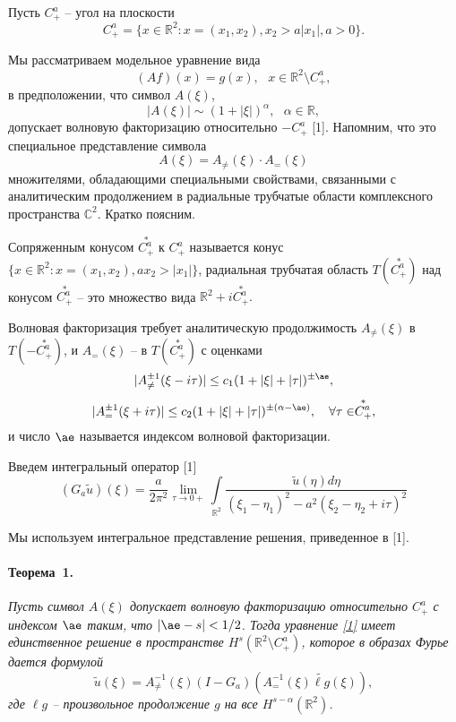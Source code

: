 \documentclass{vzmsthesis}
\begin{document}



\vzmscaption



Пусть $C^a_+$ -- угол на плоскости
\[
C^a_+=\{x\in\mathbb R^2: x=(x_1,x_2), x_2>a|x_1|, a>0\}.
\]

Мы рассматриваем модельное уравнение вида
\begin{equation}\label{1}
(Af)(x)=g(x),~~~x\in\mathbb R^{2}\setminus C^a_+,
\end{equation}
в предположении, что символ $A(\xi)$,
 \[
 |A(\xi)|\sim(1+|\xi|)^{\alpha},~~~\alpha\in\mathbb R,
 \]
 допускает волновую факторизацию относительно $-C^a_+$ [1].  Напомним, что это специальное представление символа
\[
A(\xi)=A_{\neq}(\xi)\cdot A_=(\xi)
\]
 множителями, обладающими специальными свойствами, связанными с аналитическим продолжением в радиальные трубчатые области комплексного пространства  $\mathbb C^2$. Кратко поясним.

 Сопряженным конусом $\stackrel{*}{C^a_+}$ к $C^a_+$  называется конус $\{x\in\mathbb R^2: x=(x_1,x_2), ax_2>|x_1|\}$, радиальная трубчатая область $T(\stackrel{*}{C^a_+})$ над конусом $\stackrel{*}{C^a_+}$ -- это множество вида $\mathbb R^2+i\stackrel{*}{C^a_+}.$

 Волновая факторизация требует аналитическую продолжимость $A_{\neq}(\xi)$ в $T(-\stackrel{*}{C^a_+})$, и $A_=(\xi)$ -- в $T(\stackrel{*}{C^a_+})$ с оценками
 \[
 |A^{\pm 1}_{\neq}(\xi-i\tau)|\leq c_1(1+|\xi|+|\tau|)^{\pm\ae},
 \]
 \[
 |A^{\pm 1}_=(\xi+i\tau)|\leq c_2(1+|\xi|+|\tau|)^{\pm(\alpha-\ae)},~~~\forall\tau\in\stackrel{*}{C^a_+},
 \]
и число $\ae$ называется индексом волновой факторизации.

Введем интегральный оператор [1]
\[
(G_a\tilde u)(\xi)=\frac{a}{2\pi^2}\lim\limits_{\tau\to 0+}\int\limits_{\mathbb R^2}\frac{\tilde u(\eta)d\eta}{(\xi_1-\eta_1)^2-a^2(\xi_2-\eta_2+i\tau)^2}
\]

Мы используем интегральное представление решения, приведенное в [1].

\paragraph{Теорема~1.} {\it
 Пусть символ $A(\xi)$ допускает волновую факторизацию относительно $C^a_+$ с индексом $\ae$ таким, что $|\ae-s|<1/2$. Тогда уравнение \eqref{1} имеет единственное решение в пространстве  $H^s(\mathbb R^2\setminus C^a_+)$, которое в образах Фурье дается формулой
 \[
 \tilde u(\xi)=A^{-1}_{\neq}(\xi)(I-G_a)(A^{-1}_=(\xi)\widetilde{\ell g}(\xi)),
 \]
где $\ell g$ -- произвольное продолжение $g$ на все $H^{s-\alpha}(\mathbb R^2)$.
}
\end{document}
